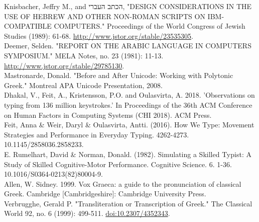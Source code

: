 \documentclass[11pt]{article}
\begin{document}
Knisbacher, Jeffry M., and \texthebrew{הכתב העברי}, "DESIGN CONSIDERATIONS IN THE USE OF HEBREW AND OTHER NON-ROMAN SCRIPTS ON IBM-COMPATIBLE COMPUTERS." Proceedings of the World Congress of Jewish Studies (1989): 61-68. \url{http://www.jstor.org/stable/23535305}. \\

Deemer, Selden. "REPORT ON THE ARABIC LANGUAGE IN COMPUTERS SYMPOSIUM." MELA Notes, no. 23 (1981): 11-13. \url{http://www.jstor.org/stable/29785130}. \\

Mastronarde, Donald. "Before and After Unicode: Working with Polytonic Greek." Montreal APA Unicode Presentation, 2008. \\

Dhakal, V., Feit, A., Kristensson, P.O. and Oulasvirta, A. 2018. 'Observations on typing from 136 million keystrokes.' In Proceedings of the 36th ACM Conference on Human Factors in Computing Systems (CHI 2018). ACM Press. \\

Feit, Anna \& Weir, Daryl \& Oulasvirta, Antti. (2016). How We Type: Movement Strategies and Performance in Everyday Typing. 4262-4273. 10.1145/2858036.2858233. \\

E. Rumelhart, David \& Norman, Donald. (1982). Simulating a Skilled Typist: A Study of Skilled Cognitive-Motor Performance. Cognitive Science. 6. 1-36. 10.1016/S0364-0213(82)80004-9. \\

Allen, W. Sidney. 1999. Vox Graeca: a guide to the pronunciation of classical Greek. Cambridge [Cambridgeshire]: Cambridge University Press. \\

Verbrugghe, Gerald P. "Transliteration or Transcription of Greek." The Classical World 92, no. 6 (1999): 499-511. \url{doi:10.2307/4352343}.
\end{document}
